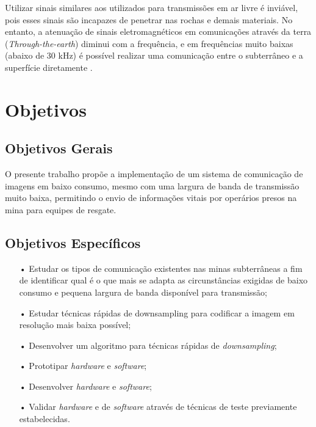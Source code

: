 Utilizar sinais similares aos utilizados para transmissões em ar livre é inviável, pois esses sinais são incapazes de penetrar nas rochas e demais materiais. No entanto, a atenuação de sinais eletromagnéticos em comunicações através da terra (\textit{Through-the-earth}) diminui com a frequência, e em frequências muito baixas (abaixo de 30 kHz) é possível realizar uma comunicação entre o subterrâneo e a superfície diretamente \cite{bandyopadhyay2010wireless}.

\section{Objetivos}
\label{OBJETIVOS}
\subsection{Objetivos Gerais}

	O presente trabalho propõe a implementação de um sistema de comunicação de imagens em baixo consumo, mesmo com uma largura de banda de transmissão muito baixa, permitindo o envio de informações vitais por operários presos na mina para equipes de resgate.


\subsection{Objetivos Específicos}
\begin{itemize}
	\item[•]Estudar os tipos de comunicação existentes nas minas subterrâneas a fim de identificar qual é o que mais se adapta as circunstâncias exigidas de baixo consumo e pequena largura de banda disponível para transmissão;	
\item[•]Estudar técnicas rápidas de downsampling para codificar a imagem em resolução mais baixa possível;
\item[•]Desenvolver um algoritmo para técnicas rápidas de  \textit{downsampling};
\item[•]Prototipar \textit{hardware} e \textit{software};
\item[•]Desenvolver \textit{hardware} e \textit{software};
\item[•]Validar \textit{hardware} e de \textit{software} através de técnicas de teste previamente estabelecidas.
\end{itemize}